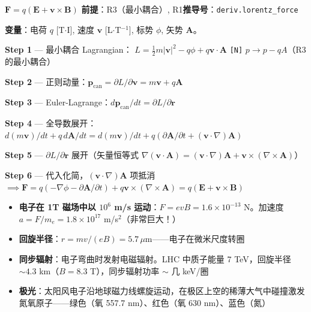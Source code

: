 \begin{lawbox}
  $\mathbf{F} = q(\mathbf{E} + \mathbf{v}\times\mathbf{B})$
  \quad\textbf{前提}：R3（最小耦合）, R1\quad\textbf{推导号}：\texttt{deriv.lorentz\_force}
\end{lawbox}

\noindent\textbf{变量}：电荷 $q$ [T$\cdot$I], 速度 $\mathbf{v}$ [L$\cdot$T$^{-1}$], 标势 $\phi$, 矢势 $\mathbf{A}$。

\begin{derivationbox}
  \textbf{Step 1} — 最小耦合 Lagrangian：
  $L = \frac{1}{2}m|\mathbf{v}|^2 - q\phi + q\mathbf{v}\cdot\mathbf{A}$
  \hfill\texttt{[N]} $p \to p - qA$（R3 的最小耦合）

  \textbf{Step 2} — 正则动量：$\mathbf{p}_{\text{can}} = \partial L/\partial\mathbf{v} = m\mathbf{v} + q\mathbf{A}$

  \textbf{Step 3} — Euler-Lagrange：$d\mathbf{p}_{\text{can}}/dt = \partial L/\partial\mathbf{r}$

  \textbf{Step 4} — 全导数展开：$d(m\mathbf{v})/dt + q\,d\mathbf{A}/dt = d(m\mathbf{v})/dt + q(\partial\mathbf{A}/\partial t + (\mathbf{v}\cdot\nabla)\mathbf{A})$

  \textbf{Step 5} — $\partial L/\partial\mathbf{r}$ 展开（矢量恒等式 $\nabla(\mathbf{v}\cdot\mathbf{A}) = (\mathbf{v}\cdot\nabla)\mathbf{A} + \mathbf{v}\times(\nabla\times\mathbf{A})$）

  \textbf{Step 6} — 代入化简，$(\mathbf{v}\cdot\nabla)\mathbf{A}$ 项抵消 $\implies \mathbf{F} = q(-\nabla\phi - \partial\mathbf{A}/\partial t) + q\mathbf{v}\times(\nabla\times\mathbf{A}) = q(\mathbf{E} + \mathbf{v}\times\mathbf{B})$
\end{derivationbox}

\begin{oombox}
  \begin{itemize}
    \item \textbf{电子在 1T 磁场中以 $10^6$ m/s 运动}：$F = evB = 1.6\times 10^{-13}$ N。加速度 $a = F/m_e = 1.8\times 10^{17}$ m/s$^2$（非常巨大！）
    \item \textbf{回旋半径}：$r = mv/(eB) = 5.7\,\mu$m——电子在微米尺度转圈
    \item \textbf{同步辐射}：电子弯曲时发射电磁辐射。LHC 中质子能量 7 TeV，回旋半径 $\sim 4.3$ km（$B=8.3$ T），同步辐射功率 $\sim$ 几 keV/圈
    \item \textbf{极光}：太阳风电子沿地球磁力线螺旋运动，在极区上空的稀薄大气中碰撞激发氮氧原子——绿色（氧 557.7 nm）、红色（氧 630 nm）、蓝色（氮）
  \end{itemize}
\end{oombox}

